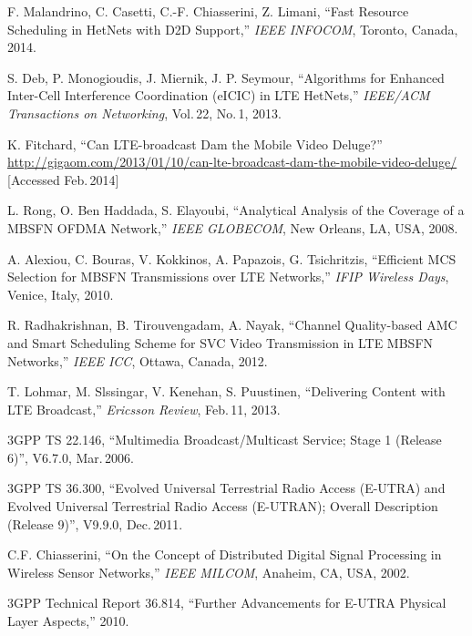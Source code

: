 \documentclass[10pt, conference, compsocconf]{IEEEtran}
\numberwithin{equation}{section}
\begin{document}
\begin{thebibliography}{99}





F. Malandrino, C. Casetti, C.-F. Chiasserini, Z. Limani,
``Fast Resource Scheduling in HetNets with D2D Support,''
\emph{IEEE INFOCOM}, Toronto, Canada,  2014.

S. Deb, P. Monogioudis, J. Miernik, J. P. Seymour,
``Algorithms for Enhanced Inter-Cell Interference Coordination (eICIC) in LTE HetNets,''
\emph{IEEE/ACM Transactions on Networking}, Vol.\,22, No.\,1, 2013.

K. Fitchard, 
``Can LTE-broadcast Dam the Mobile Video Deluge?''
\url{http://gigaom.com/2013/01/10/can-lte-broadcast-dam-the-mobile-video-deluge/}
[Accessed Feb.\,2014]


L. Rong, O. Ben Haddada, S. Elayoubi,  
``Analytical Analysis of the Coverage of a MBSFN OFDMA Network,''  
\emph{IEEE GLOBECOM}, New Orleans, LA, USA, 2008.

A. Alexiou, C. Bouras, V. Kokkinos, A. Papazois,  G. Tsichritzis,
``Efficient MCS Selection for MBSFN Transmissions over LTE Networks,''  
\emph{IFIP Wireless Days}, Venice, Italy, 2010.





R. Radhakrishnan, B. Tirouvengadam,  A. Nayak,
``Channel Quality-based AMC and Smart Scheduling Scheme for SVC Video Transmission in LTE MBSFN Networks,''  
\emph{IEEE ICC}, Ottawa, Canada, 2012.







T. Lohmar, M. Slssingar, V. Kenehan, S. Puustinen,
``Delivering Content with LTE Broadcast,'' \emph{Ericsson Review},
Feb.\,11, 2013.


3GPP TS 22.146, 
``Multimedia Broadcast/Multicast Service; Stage 1 (Release 6)'', V6.7.0, Mar.\,2006.

3GPP TS 36.300, 
``Evolved Universal Terrestrial Radio
Access (E-UTRA) and Evolved Universal Terrestrial Radio
Access (E-UTRAN); Overall Description (Release 9)'', V9.9.0, Dec.\,2011. 










C.F. Chiasserini,  
``On the Concept of Distributed Digital Signal Processing in Wireless Sensor Networks,''  
\emph{IEEE MILCOM}, Anaheim, CA, USA,  2002.

3GPP Technical Report 36.814,
``Further Advancements for E-UTRA Physical Layer Aspects,'' 2010.

\end{thebibliography}
\end{document}
